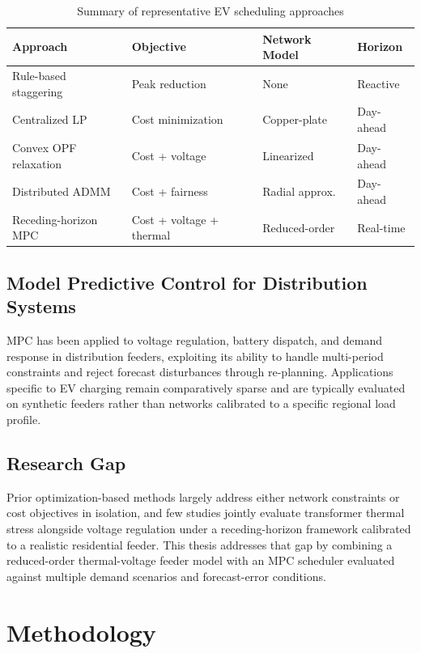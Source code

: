 \documentclass[12pt,twoside]{report}
\begin{document}
\begin{table}[htbp]
\centering
\caption{Summary of representative EV scheduling approaches}
\label{tab:litsummary}
\small
\begin{tabular}{@{}p{3.0cm}p{4.4cm}p{3.0cm}p{3.0cm}@{}}
\toprule
\textbf{Approach} & \textbf{Objective} & \textbf{Network Model} & \textbf{Horizon} \\
\midrule
Rule-based staggering & Peak reduction & None & Reactive \\
Centralized LP & Cost minimization & Copper-plate & Day-ahead \\
Convex OPF relaxation & Cost + voltage & Linearized & Day-ahead \\
Distributed ADMM & Cost + fairness & Radial approx. & Day-ahead \\
Receding-horizon MPC & Cost + voltage + thermal & Reduced-order & Real-time \\
\bottomrule
\end{tabular}
\end{table}

\section{Model Predictive Control for Distribution Systems}
MPC has been applied to voltage regulation, battery dispatch, and demand response in
distribution feeders, exploiting its ability to handle multi-period constraints and reject
forecast disturbances through re-planning. Applications specific to EV charging remain
comparatively sparse and are typically evaluated on synthetic feeders rather than networks
calibrated to a specific regional load profile.

\section{Research Gap}
Prior optimization-based methods largely address either network constraints or cost objectives
in isolation, and few studies jointly evaluate transformer thermal stress alongside voltage
regulation under a receding-horizon framework calibrated to a realistic residential feeder.
This thesis addresses that gap by combining a reduced-order thermal-voltage feeder model with
an MPC scheduler evaluated against multiple demand scenarios and forecast-error conditions.

\chapter{Methodology}
\label{ch:method}
\end{document}
